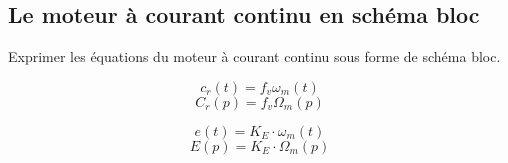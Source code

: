 \documentclass[11pt,oneside]{article}
\begin{document}
\subsection{Le moteur à courant continu en schéma bloc}
\begin{exemple}
Exprimer les équations du moteur à courant continu sous forme de schéma bloc.

\begin{minipage}[c]{.3\linewidth}
$$
c_r(t) = f_v \omega_m(t)
$$
$$
C_r(p) = f_v \Omega_m(p)
$$
\end{minipage}\hfill
\begin{minipage}[c]{.3\linewidth}
\end{minipage} \hfill
\begin{minipage}[c]{.3\linewidth}
\end{minipage}

\begin{minipage}[c]{.3\linewidth}
$$
e(t)=K_E \cdot \omega_m(t) $$
$$
E(p)=K_E \cdot \Omega_m(p)
$$
\end{minipage}\hfill
\begin{minipage}[c]{.3\linewidth}
\end{minipage} \hfill
\begin{minipage}[c]{.3\linewidth}
\end{minipage}


\end{exemple}
\end{document}
